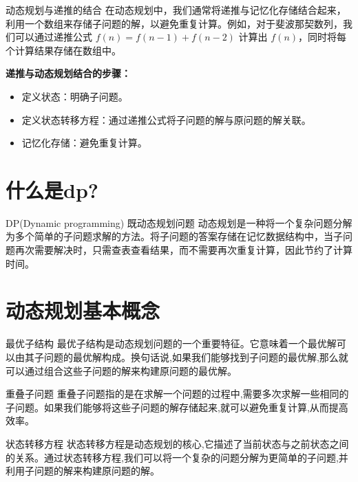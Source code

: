 \documentclass{beamer}
\begin{document}
\begin{frame}{动态规划与递推的结合}
    在动态规划中，我们通常将递推与记忆化存储结合起来，利用一个数组来存储子问题的解，以避免重复计算。例如，对于斐波那契数列，我们可以通过递推公式 $f(n) = f(n-1) + f(n-2)$ 计算出 $f(n)$，同时将每个计算结果存储在数组中。
    
    \textbf{递推与动态规划结合的步骤：}
    \begin{itemize}
        \item 定义状态：明确子问题。
        \item 定义状态转移方程：通过递推公式将子问题的解与原问题的解关联。
        \item 记忆化存储：避免重复计算。
    \end{itemize}
\end{frame}


\section{什么是dp?}

\begin{frame}{DP(Dynamic programming) 既动态规划问题}
    动态规划是一种将一个复杂问题分解为多个简单的子问题求解的方法。将子问题的答案存储在记忆数据结构中，当子问题再次需要解决时，只需查表查看结果，而不需要再次重复计算，因此节约了计算时间。
\end{frame}

\section{动态规划基本概念}

\begin{frame}{最优子结构}
    最优子结构是动态规划问题的一个重要特征。它意味着一个最优解可以由其子问题的最优解构成。换句话说,如果我们能够找到子问题的最优解,那么就可以通过组合这些子问题的解来构建原问题的最优解。
\end{frame}

\begin{frame}{重叠子问题}
    重叠子问题指的是在求解一个问题的过程中,需要多次求解一些相同的子问题。如果我们能够将这些子问题的解存储起来,就可以避免重复计算,从而提高效率。
\end{frame}

\begin{frame}{状态转移方程}
    状态转移方程是动态规划的核心,它描述了当前状态与之前状态之间的关系。通过状态转移方程,我们可以将一个复杂的问题分解为更简单的子问题,并利用子问题的解来构建原问题的解。
\end{frame}
\end{document}
